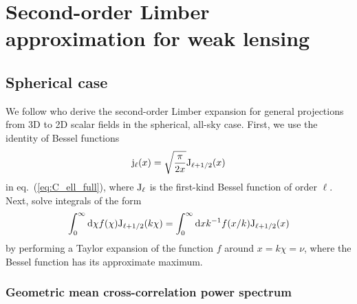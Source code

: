 \documentclass[fleqn,usenatbib]{mnras} %
\begin{document}
\section{Second-order Limber approximation for weak lensing}
\label{sec:L2}

\subsection{Spherical case}

We follow \cite{2008PhRvD..78l3506L} who derive the second-order Limber
expansion for general projections from 3D to 2D scalar fields in the spherical,
all-sky case. First, we use the identity of Bessel functions
%
\begin{equation}
  {\rm j}_\ell(x) = \sqrt{\frac{\pi}{2x}} {\rm J}_{\ell + 1/2}(x)
\end{equation}
%
in eq.~(\ref{eq:C_ell_full}), where ${\rm J}_\ell$ is the first-kind Bessel
function of order $\ell$. Next, \cite{2008PhRvD..78l3506L} solve integrals of
the form
%
\begin{equation}
  \int_0^\infty {\rm d} \chi f(\chi) {\rm J}_{\ell + 1/2}(k \chi)
  = \int_0^\infty {\rm d} x k^{-1} f(x/k) {\rm J}_{\ell + 1/2}(x)
  \label{eq:int_dchi}
\end{equation}
%
by performing a Taylor expansion of the function $f$ around $x = k \chi = \nu$, where
the Bessel function has its approximate maximum.

\subsubsection{Geometric mean cross-correlation power spectrum}
\end{document}
